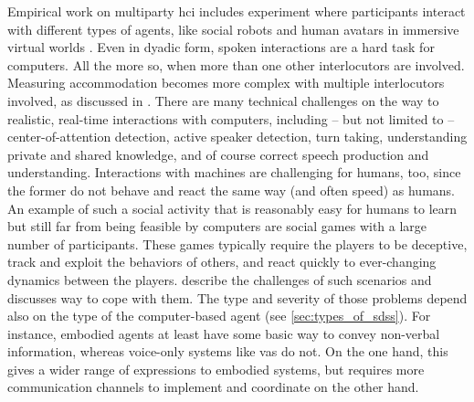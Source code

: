 Empirical work on multiparty \ac{hci} includes experiment where participants interact with different types of agents, like social robots \citep{Foster2012two, Ibrahim2019fundamental} and human avatars in immersive virtual worlds \citep{Traum2002embodied}.
Even in dyadic form, spoken interactions are a hard task for computers.
All the more so, when more than one other interlocutors are involved.
Measuring accommodation becomes more complex with multiple interlocutors involved, as discussed in \citet{Rahimi2019acoustic}.
There are many technical challenges on the way to realistic, real-time interactions with computers, including -- but not limited to -- center-of-attention detection, active speaker detection, turn taking, understanding private and shared knowledge, and of course correct speech production and understanding.
Interactions with machines are challenging for humans, too, since the former do not behave and react the same way (and often speed) as humans.
An example of such a social activity that is reasonably easy for humans to learn but still far from being feasible by computers are social games with a large number of participants.
These games typically require the players to be deceptive, track and exploit the behaviors of others, and react quickly to ever-changing dynamics between the players.
 describe the challenges of such scenarios and discusses way to cope with them.
The type and severity of those problems depend also on the type of the computer-based agent (see \cref{sec:types_of_sdss}).
For instance, embodied agents at least have some basic way to convey non-verbal information, whereas voice-only systems like \acp{va} do not.
On the one hand, this gives a wider range of expressions to embodied systems, but requires more communication channels to implement and coordinate on the other hand.


